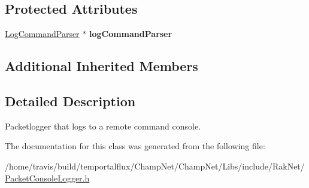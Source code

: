 \subsection*{Protected Attributes}
\begin{DoxyCompactItemize}
\item 
\hypertarget{class_rak_net_1_1_packet_console_logger_a8146ffad99434e60485fac6f1cf96af1}{\hyperlink{class_rak_net_1_1_log_command_parser}{Log\-Command\-Parser} $\ast$ {\bfseries log\-Command\-Parser}}\label{class_rak_net_1_1_packet_console_logger_a8146ffad99434e60485fac6f1cf96af1}

\end{DoxyCompactItemize}
\subsection*{Additional Inherited Members}


\subsection{Detailed Description}
Packetlogger that logs to a remote command console. 

The documentation for this class was generated from the following file\-:\begin{DoxyCompactItemize}
\item 
/home/travis/build/temportalflux/\-Champ\-Net/\-Champ\-Net/\-Libs/include/\-Rak\-Net/\hyperlink{_packet_console_logger_8h}{Packet\-Console\-Logger.\-h}\end{DoxyCompactItemize}
